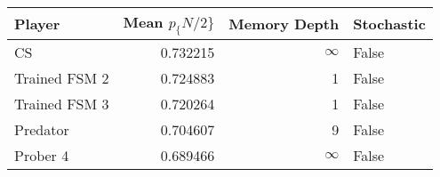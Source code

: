 \begin{tabular}{lrrl}
\toprule
        Player &  Mean $p_\{N/2\}$ &  Memory Depth & Stochastic \\
\midrule
            CS &        0.732215 &            \(\infty\) &      False \\
 Trained FSM 2 &        0.724883 &             1 &      False \\
 Trained FSM 3 &        0.720264 &             1 &      False \\
      Predator &        0.704607 &             9 &      False \\
      Prober 4 &        0.689466 &            \(\infty\) &      False \\
\bottomrule
\end{tabular}
